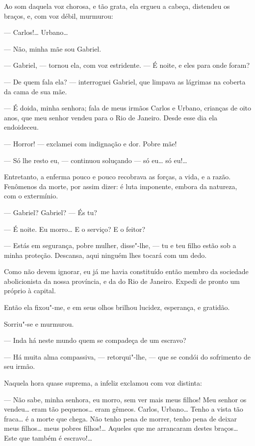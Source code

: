 Ao som daquela voz chorosa, e tão grata, ela ergueu a cabeça, distendeu
os braços, e, com voz débil, murmurou:

--- Carlos!\ldots{} Urbano\ldots{}

--- Não, minha mãe sou Gabriel.

--- Gabriel, --- tornou ela, com voz estridente. --- É noite, e eles para
onde foram?

--- De quem fala ela? --- interroguei Gabriel, que limpava as lágrimas na
coberta da cama de sua mãe.

--- É doida, minha senhora; fala de meus irmãos Carlos e Urbano,
crianças de oito anos, que meu senhor vendeu para o Rio de Janeiro.
Desde esse dia ela endoideceu.

--- Horror! --- exclamei com indignação e dor. Pobre mãe!

--- Só lhe resto eu, --- continuou soluçando --- só eu\ldots{} só eu!\ldots{}

Entretanto, a enferma pouco e pouco recobrava as forças, a vida, e a
razão. Fenômenos da morte, por assim dizer: é luta imponente, embora da
natureza, com o extermínio.

--- Gabriel? Gabriel? --- És tu?

--- É noite. Eu morro\ldots{} E o serviço? E o feitor?

--- Estás em segurança, pobre mulher, disse"-lhe, --- tu e teu filho estão
sob a minha proteção. Descansa, aqui ninguém lhes tocará com um dedo.

Como não devem ignorar, eu já me havia constituído então membro da
sociedade abolicionista da nossa província, e da do Rio de Janeiro.
Expedi de pronto um próprio à capital.

Então ela fixou"-me, e em seus olhos brilhou lucidez, esperança, e
gratidão.

Sorriu"-se e murmurou.

--- Inda há neste mundo quem se compadeça de um escravo?

--- Há muita alma compassiva, --- retorqui"-lhe, --- que se condói do
sofrimento de seu irmão.

Naquela hora quase suprema, a infeliz exclamou com voz distinta:

--- Não sabe, minha senhora, eu morro, sem ver mais meus filhos! Meu
senhor os vendeu\ldots{} eram tão pequenos\ldots{} eram gêmeos. Carlos, Urbano\ldots{}
Tenho a vista tão fraca\ldots{} é a morte que chega. Não tenho pena de
morrer, tenho pena de deixar meus filhos\ldots{} meus pobres filhos!\ldots{}
Aqueles que me arrancaram destes braços\ldots{} Este que também é escravo!\ldots{}

